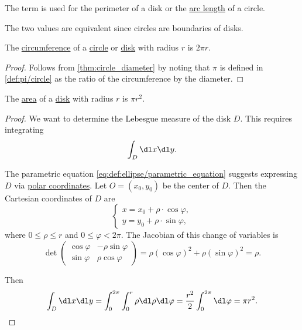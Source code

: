 \begin{definition}\label{def:circumference}
  The term  is used for the perimeter of a disk or the \hyperref[def:arc_length]{arc length} of a circle.
\end{definition}
\begin{defproof}
  The two values are equivalent since circles are boundaries of disks.
\end{defproof}

\begin{proposition}\label{thm:circumference}
  The \hyperref[def:circumference]{circumference} of a \hyperref[def:circle]{circle} or \hyperref[def:disk]{disk} with radius \( r \) is \( 2\pi r \).
\end{proposition}
\begin{proof}
  Follows from \cref{thm:circle_diameter} by noting that \( \pi \) is defined in \cref{def:pi/circle} as the ratio of the circumference by the diameter.
\end{proof}

\begin{proposition}\label{thm:area_of_circle}
  The \hyperref[def:figure_area]{area} of a \hyperref[def:disk]{disk} with radius \( r \) is \( \pi r^2 \).
\end{proposition}
\begin{proof}
  We want to determine the Lebesgue measure of the disk \( D \). This requires integrating
  \begin{equation*}
    \int_D \dl x \dl y.
  \end{equation*}

  The parametric equation \eqref{eq:def:ellipse/parametric_equation} suggests expressing \( D \) via \hyperref[con:polar_coordinate_system]{polar coordinates}. Let \( O = (x_0, y_0) \) be the center of \( D \). Then the Cartesian coordinates of \( D \) are
  \begin{equation*}
    \begin{cases}
      x = x_0 + \rho \cdot \cos \varphi, \\
      y = y_0 + \rho \cdot \sin \varphi,
    \end{cases}
  \end{equation*}
  where \( 0 \leq \rho \leq r \) and \( 0 \leq \varphi < 2\pi \). The Jacobian of this change of variables is
  \begin{equation*}
    \det
    \begin{pmatrix}
      \cos \varphi & -\rho \sin \varphi \\
      \sin \varphi & \rho \cos \varphi
    \end{pmatrix}
    =
    \rho (\cos \varphi)^2 + \rho (\sin \varphi)^2
    =
    \rho.
  \end{equation*}

  Then
  \begin{equation*}
    \int_D \dl x \dl y
    =
    \int_0^{2\pi} \int_0^r \rho \dl \rho \dl \varphi
    =
    \frac {r^2} 2 \int_0^{2\pi} \dl \varphi
    =
    \pi r^2.
  \end{equation*}
\end{proof}
